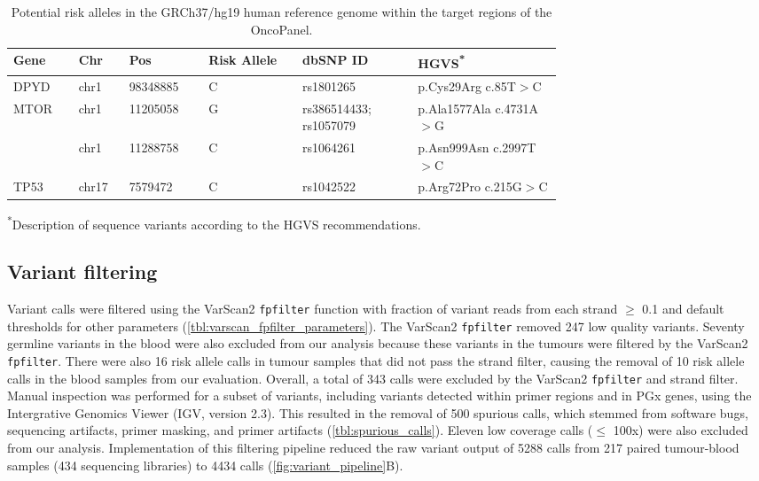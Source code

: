 \begin{longtable}{p{0.08\linewidth}|p{0.05\linewidth}p{0.1\linewidth}p{0.13\linewidth}p{0.16\linewidth}p{0.2\linewidth}}
    \caption{Potential risk alleles in the GRCh37/hg19 human reference genome within the target regions of the OncoPanel.}
    \label{tbl:potential_risk_alleles}
        \\
        \hline
        Gene & Chr & Pos & Risk Allele & dbSNP ID & HGVS\textsuperscript{*}
				\\
				\hline
        DPYD & chr1 & 98348885 & C & rs1801265 & p.Cys29Arg c.85T$>$C
        \\
        MTOR & chr1 & 11205058 & G & rs386514433; rs1057079 & p.Ala1577Ala c.4731A$>$G
        \\
        & chr1 & 11288758 & C & rs1064261 & p.Asn999Asn c.2997T$>$C
        \\
        TP53 & chr17 & 7579472 & C & rs1042522 & p.Arg72Pro c.215G$>$C
        \\
				\hline
\end{longtable}
\textsuperscript{*}Description of sequence variants according to the HGVS recommendations.


\subsection{Variant filtering}

Variant calls were filtered using the VarScan2 \texttt{fpfilter} function with fraction of variant reads from each strand $\geq$ 0.1 and default thresholds for other parameters (\autoref{tbl:varscan_fpfilter_parameters}). The VarScan2 \texttt{fpfilter} removed 247 low quality variants. Seventy germline variants in the blood were also excluded from our analysis because these variants in the tumours were filtered by the VarScan2 \texttt{fpfilter}. There were also 16 risk allele calls in tumour samples that did not pass the strand filter, causing the removal of 10 risk allele calls in the blood samples from our evaluation. Overall, a total of 343 calls were excluded by the VarScan2 \texttt{fpfilter} and strand filter. Manual inspection was performed for a subset of variants, including variants detected within primer regions and in PGx genes, using the Intergrative Genomics Viewer (IGV, version 2.3). This resulted in the removal of 500 spurious calls, which stemmed from software bugs, sequencing artifacts, primer masking, and primer artifacts (\autoref{tbl:spurious_calls}). Eleven low coverage calls ($\leq$ 100x) were also excluded from our analysis. Implementation of this filtering pipeline reduced the raw variant output of 5288 calls from 217 paired tumour-blood samples (434 sequencing libraries) to 4434 calls (\autoref{fig:variant_pipeline}B).

